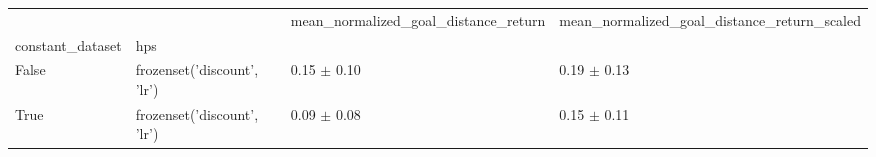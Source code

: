 \begin{tabular}{llll}
\toprule
 &  & mean_normalized_goal_distance_return & mean_normalized_goal_distance_return_scaled \\
constant_dataset & hps &  &  \\
\midrule
False & frozenset({'discount', 'lr'}) & 0.15 $\pm$ 0.10 & 0.19 $\pm$ 0.13 \\
\cline{1-4}
True & frozenset({'discount', 'lr'}) & 0.09 $\pm$ 0.08 & 0.15 $\pm$ 0.11 \\
\cline{1-4}
\bottomrule
\end{tabular}

